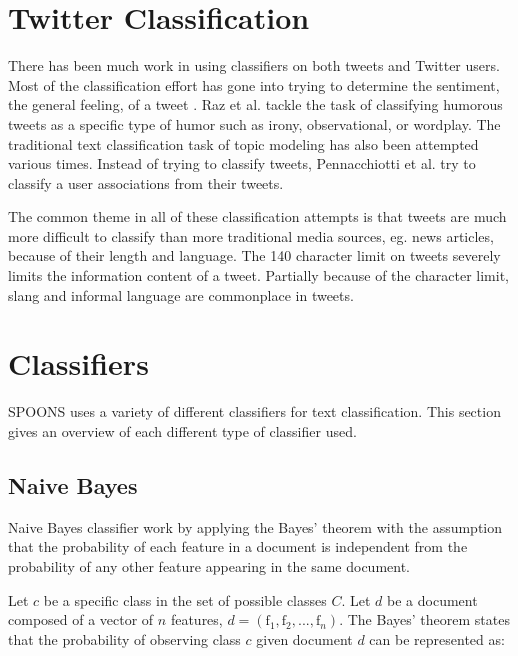 \documentclass[12pt]{ucthesis}
\begin{document}
\section{Twitter Classification}
\label{background-classification}
There has been much work in using classifiers on both tweets and Twitter users.
Most of the classification effort has gone into trying to determine the sentiment,
the general feeling, of a tweet \cite{Jiang}\cite{Mukherjee}\cite{Saif}\cite{Wang}.
Raz et al. tackle the task of classifying humorous tweets as a specific type of humor
such as irony, observational, or wordplay\cite{Raz}.
The traditional text classification task of topic modeling has also been attempted various times\cite{hong}\cite{Zhao}.
Instead of trying to classify tweets, Pennacchiotti et al. try to classify a user associations from
their tweets\cite{Pennacchiotti}.

The common theme in all of these classification attempts is that tweets are much more difficult to
classify than more traditional media sources, eg. news articles, because of their length and language.
The 140 character limit on tweets severely limits the information content of a tweet.
Partially because of the character limit, slang and informal language are commonplace in tweets.

\section{Classifiers}
\label{background-classification-classifiers}
SPOONS uses a variety of different classifiers for text classification.
This section gives an overview of each different type of classifier used.

\subsection{Naive Bayes}
\label{background-classification-classifiers-naive-bayes}
Naive Bayes classifier work by applying the Bayes' theorem with the assumption that
the probability of each feature in a document is independent from the probability of
any other feature appearing in the same document.\cite{Kibriya}\cite{Frank}

Let $c$ be a specific class in the set of possible classes $C$.
Let $d$ be a document composed of a vector of $n$ features, $d = (\textrm{f}_{1}, \textrm{f}_{2}, ..., \textrm{f}_{n})$.
The Bayes' theorem states that the probability of observing class $c$ given document $d$
can be represented as:
\end{document}
